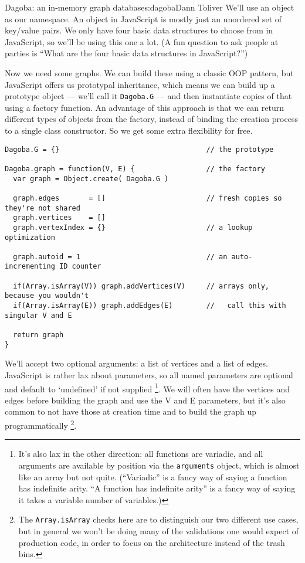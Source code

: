 \begin{aosachapter}{Dagoba: an in-memory graph database}{s:dagoba}{Dann Toliver}
We'll use an object as our namespace. An object in JavaScript is mostly
just an unordered set of key/value pairs. We only have four basic data
structures to choose from in JavaScript, so we'll be using this one a
lot. (A fun question to ask people at parties is ``What are the four
basic data structures in JavaScript?'')

Now we need some graphs. We can build these using a classic OOP pattern,
but JavaScript offers us prototypal inheritance, which means we can
build up a prototype object --- we'll call it \texttt{Dagoba.G} --- and
then instantiate copies of that using a factory function. An advantage
of this approach is that we can return different types of objects from
the factory, instead of binding the creation process to a single class
constructor. So we get some extra flexibility for free.

\begin{verbatim}
Dagoba.G = {}                                   // the prototype

Dagoba.graph = function(V, E) {                 // the factory
  var graph = Object.create( Dagoba.G )

  graph.edges       = []                        // fresh copies so they're not shared
  graph.vertices    = []
  graph.vertexIndex = {}                        // a lookup optimization

  graph.autoid = 1                              // an auto-incrementing ID counter

  if(Array.isArray(V)) graph.addVertices(V)     // arrays only, because you wouldn't
  if(Array.isArray(E)) graph.addEdges(E)        //   call this with singular V and E

  return graph
}
\end{verbatim}

We'll accept two optional arguments: a list of vertices and a list of
edges. JavaScript is rather lax about parameters, so all named
parameters are optional and default to `undefined' if not supplied
\footnote{It's also lax in the other direction: all functions are
  variadic, and all arguments are available by position via the
  \texttt{arguments} object, which is almost like an array but not
  quite. (``Variadic'' is a fancy way of saying a function has
  indefinite arity. ``A function has indefinite arity'' is a fancy way
  of saying it takes a variable number of variables.)}. We will often
have the vertices and edges before building the graph and use the V and
E parameters, but it's also common to not have those at creation time
and to build the graph up programmatically \footnote{The
  \texttt{Array.isArray} checks here are to distinguish our two
  different use cases, but in general we won't be doing many of the
  validations one would expect of production code, in order to focus on
  the architecture instead of the trash bins.}.


\end{aosachapter}
